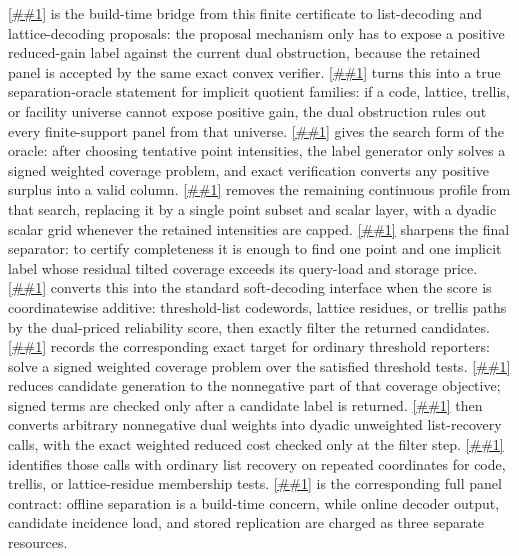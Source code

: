 \documentclass[10pt]{article}
\newcommand{\Cref}[1]{\ref{##1}}
\theoremstyle{definition}
\begin{document}
\Cref{lem:seeded-reduced-gain-search} is the build-time bridge from this
finite certificate to list-decoding and lattice-decoding proposals: the
proposal mechanism only has to expose a positive reduced-gain label against
the current dual obstruction, because the retained panel is accepted by the
same exact convex verifier.  \Cref{lem:implicit-reduced-gain-separation}
turns this into a true separation-oracle statement for implicit quotient
families: if a code, lattice, trellis, or facility universe cannot expose
positive gain, the dual obstruction rules out every finite-support panel from
that universe.  \Cref{lem:reduced-gain-variational-separation} gives the
search form of the oracle: after choosing tentative point intensities, the
label generator only solves a signed weighted coverage problem, and exact
verification converts any positive surplus into a valid column.
\Cref{lem:layer-cake-reduced-gain-separation} removes the remaining continuous
profile from that search, replacing it by a single point subset and scalar
layer, with a dyadic scalar grid whenever the retained intensities are capped.
\Cref{cor:pointwise-reduced-cost-separation} sharpens the final separator:
to certify completeness it is enough to find one point and one implicit label
whose residual tilted coverage exceeds its query-load and storage price.
\Cref{cor:soft-list-decoding-reduced-cost-separator} converts this into the
standard soft-decoding interface when the score is coordinatewise additive:
threshold-list codewords, lattice residues, or trellis paths by the dual-priced
reliability score, then exactly filter the returned candidates.
\Cref{cor:threshold-event-reduced-cost} records the corresponding exact target
for ordinary threshold reporters: solve a signed weighted coverage problem over
the satisfied threshold tests.
\Cref{cor:positive-coverage-screen} reduces candidate generation to the
nonnegative part of that coverage objective; signed terms are checked only
after a candidate label is returned.
\Cref{cor:dyadic-positive-list-recovery} then converts arbitrary nonnegative
dual weights into dyadic unweighted list-recovery calls, with the exact
weighted reduced cost checked only at the filter step.
\Cref{cor:ordinary-list-recovery-positive-coverage} identifies those calls
with ordinary list recovery on repeated coordinates for code, trellis, or
lattice-residue membership tests.
\Cref{cor:unified-soft-decoded-rate-coverage} is the corresponding full panel
contract: offline separation is a build-time concern, while online decoder
output, candidate incidence load, and stored replication are charged as three
separate resources.
\end{document}
